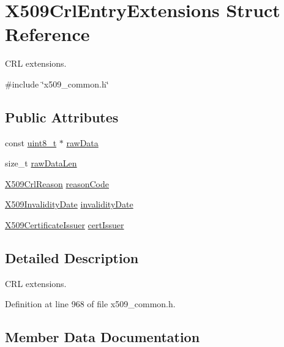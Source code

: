 \hypertarget{structX509CrlEntryExtensions}{}\section{X509\+Crl\+Entry\+Extensions Struct Reference}
\label{structX509CrlEntryExtensions}


C\+RL extensions.  




{\ttfamily \#include \char`\"{}x509\+\_\+common.\+h\char`\"{}}

\subsection*{Public Attributes}
\begin{DoxyCompactItemize}
\item 
const \hyperlink{stdint_8h_aba7bc1797add20fe3efdf37ced1182c5}{uint8\+\_\+t} $\ast$ \hyperlink{structX509CrlEntryExtensions_aac3e654a7a82417ec2b4d467b920b331}{raw\+Data}
\item 
size\+\_\+t \hyperlink{structX509CrlEntryExtensions_ae9e2a3a5ed2c1dd2aac65ec95b66cebe}{raw\+Data\+Len}
\item 
\hyperlink{structX509CrlReason}{X509\+Crl\+Reason} \hyperlink{structX509CrlEntryExtensions_abf5c1417352a318774053023e5ba2349}{reason\+Code}
\item 
\hyperlink{structX509InvalidityDate}{X509\+Invalidity\+Date} \hyperlink{structX509CrlEntryExtensions_a9e9e24f3ceaa94ea5fd687eb9cfc9bee}{invalidity\+Date}
\item 
\hyperlink{structX509CertificateIssuer}{X509\+Certificate\+Issuer} \hyperlink{structX509CrlEntryExtensions_aa459ff4f84348b019b3d79e595cabcc1}{cert\+Issuer}
\end{DoxyCompactItemize}


\subsection{Detailed Description}
C\+RL extensions. 

Definition at line 968 of file x509\+\_\+common.\+h.



\subsection{Member Data Documentation}
\mbox{\label{structX509CrlEntryExtensions_aa459ff4f84348b019b3d79e595cabcc1}} 
